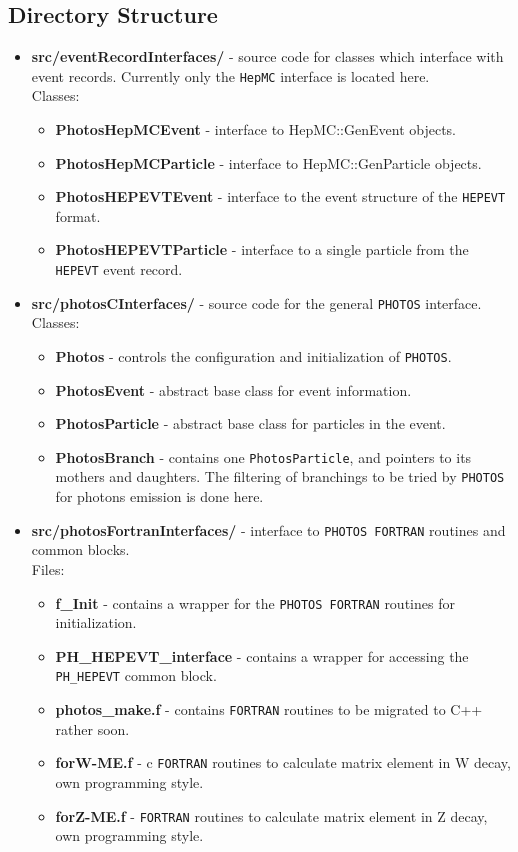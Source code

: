 \documentclass[]{Photos_interface_design}
\begin{document}
\subsection{Directory Structure}

\begin{itemize}
\item {\bf src/eventRecordInterfaces/ } - source code for classes which interface with event records.
      Currently only the {\tt HepMC} interface is located here.\\
  Classes:
  \begin{itemize}
  \item { \bf PhotosHepMCEvent} - interface to HepMC::GenEvent objects. 
  \item { \bf PhotosHepMCParticle} - interface to HepMC::GenParticle objects. 
  \item { \bf PhotosHEPEVTEvent} - interface to the event structure of the {\tt HEPEVT} format. 
  \item { \bf PhotosHEPEVTParticle} - interface to a single particle from the {\tt HEPEVT} event record.
  \end{itemize}   

\item {\bf src/photosCInterfaces/ } - source code for the general {\tt PHOTOS} interface.  \\
  Classes:
  \begin{itemize}
  \item { \bf Photos } - controls the configuration and initialization of {\tt PHOTOS}.
  \item { \bf PhotosEvent } - abstract base class for event information.
  \item { \bf PhotosParticle } - abstract base class for particles in the event.
  \item { \bf PhotosBranch } - contains one {\tt PhotosParticle}, and  pointers to its mothers and daughters.
  The filtering of branchings to be tried by {\tt PHOTOS} for photons emission is done here.
  \end{itemize}

\item {\bf src/photosFortranInterfaces/ } -  interface to {\tt PHOTOS FORTRAN} routines and common blocks. \\
  Files:
    \begin{itemize}
    \item { \bf f\_Init } - contains a wrapper for the {\tt PHOTOS FORTRAN} routines for initialization.
    \item { \bf PH\_HEPEVT\_interface } - contains a wrapper for accessing the
      {\tt  PH\_HEPEVT} common block.
    \item { \bf photos\_make.f } - contains  {\tt FORTRAN} routines to be  migrated to C++ rather soon.
    \item { \bf forW-ME.f } - c  {\tt FORTRAN} routines to calculate matrix element in W decay, own programming style.
    \item { \bf forZ-ME.f } - {\tt FORTRAN} routines  to calculate matrix element in Z decay, own programming style.
    \end{itemize}


\end{itemize}
\end{document}
